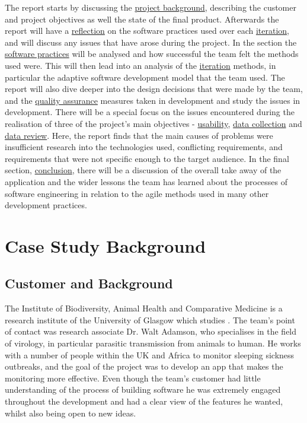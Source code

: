 \documentclass{l3proj}
\begin{document}
The report starts by discussing the \hyperref[sec:background]{project background}, describing the customer and project objectives as well the state of the final product. Afterwards the report will have a \hyperref[sec:reflection]{reflection} on the software practices used over each \hyperref[subsec:iterations]{iteration}, and will discuss any issues that have arose during the project. In the section the \hyperref[subsec:practices]{software practices} will be analysed and how successful the team felt the methods used were. This will then lead into an analysis of the \hyperref[subsec:iterations]{iteration} methods, in particular the adaptive software development model that the team used. The report will also dive deeper into the design decisions that were made by the team, and the \hyperref[subsec:qa]{quality assurance} measures taken in development and study the issues in development. There will be a special focus on the issues encountered during the realisation of three of the project's main objectives - \hyperref[subsec:us]{usability}, \hyperref[subsec:datacol]{data collection} and \hyperref[subsec:datarev]{data review}. Here, the report finds that the main causes of problems were insufficient research into the technologies used, conflicting requirements, and requirements that were not specific enough to the target audience. In the final section, \hyperref[sec:conclusion]{conclusion}, there will be a discussion of the overall take away of the application and the wider lessons the team has learned about the processes of software engineering in relation to the agile methods used in many other development practices. 

\section{Case Study Background}
\label{sec:background}

\subsection{Customer and Background}
The Institute of Biodiversity, Animal Health and Comparative Medicine is a research institute of the University of Glasgow which studies \cite{BAHCM}. The team's point of contact was research associate Dr. Walt Adamson, who specialises in the field of virology, in particular parasitic transmission from animals to human. He works with a number of people within the UK and Africa to monitor sleeping sickness outbreaks, and the goal of the project was to develop an app that makes the monitoring more effective. Even though the team's customer had little understanding of the process of building software he was extremely engaged throughout the development and had a clear view of the features he wanted, whilst also being open to new ideas.
\end{document}
